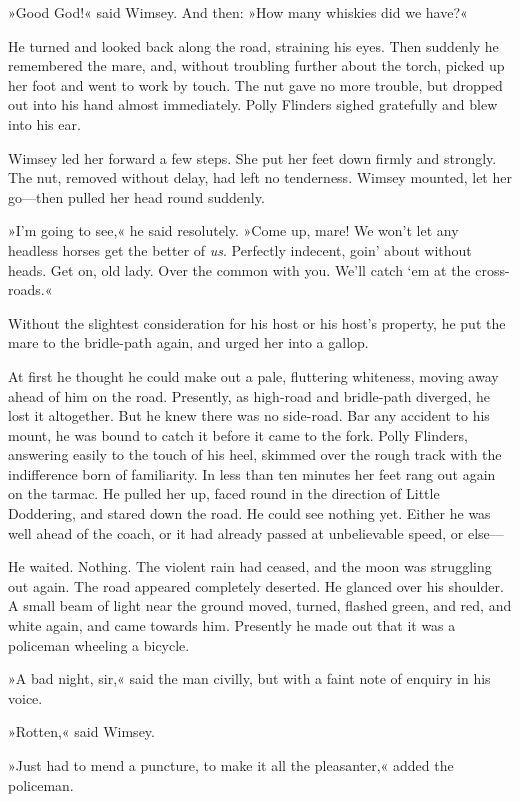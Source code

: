 »Good God!« said Wimsey. And then: »How many whiskies did we have?«

He turned and looked back along the road, straining his eyes. Then suddenly he remembered the mare, and, without troubling further about the torch, picked up her foot and went to work by touch. The nut gave no more trouble, but dropped out into his hand almost immediately. Polly Flinders sighed gratefully and blew into his ear.

Wimsey led her forward a few steps. She put her feet down firmly and strongly. The nut, removed without delay, had left no tenderness. Wimsey mounted, let her go—then pulled her head round suddenly.

»I'm going to see,« he said resolutely. »Come up, mare! We won't let any headless horses get the better of \textit{us}. Perfectly indecent, goin' about without heads. Get on, old lady. Over the common with you. We'll catch `em at the cross-roads.«

Without the slightest consideration for his host or his host's property, he put the mare to the bridle-path again, and urged her into a gallop.

At first he thought he could make out a pale, fluttering whiteness, moving away ahead of him on the road. Presently, as high-road and bridle-path diverged, he lost it altogether. But he knew there was no side-road. Bar any accident to his mount, he was bound to catch it before it came to the fork. Polly Flinders, answering easily to the touch of his heel, skimmed over the rough track with the indifference born of familiarity. In less than ten minutes her feet rang out again on the tarmac. He pulled her up, faced round in the direction of Little Doddering, and stared down the road. He could see nothing yet. Either he was well ahead of the coach, or it had already passed at unbelievable speed, or else—

He waited. Nothing. The violent rain had ceased, and the moon was struggling out again. The road appeared completely deserted. He glanced over his shoulder. A small beam of light near the ground moved, turned, flashed green, and red, and white again, and came towards him. Presently he made out that it was a policeman wheeling a bicycle.

»A bad night, sir,« said the man civilly, but with a faint note of enquiry in his voice.

»Rotten,« said Wimsey.

»Just had to mend a puncture, to make it all the pleasanter,« added the policeman.

